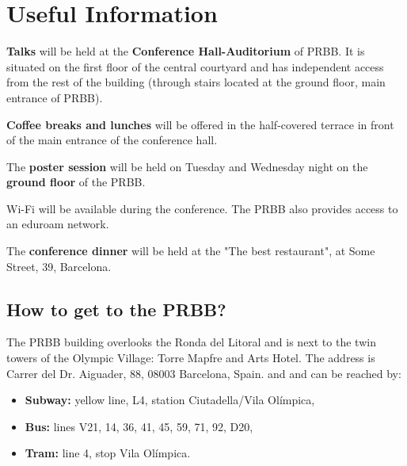 \documentclass[
	openany, %
	parskip=full, %
	12pt, %
	a4paper, %
]{conferencebooklet} %
\begin{document}

\chapter{Useful Information}

\textbf{Talks} will be held at the \textbf{Conference Hall-Auditorium} of PRBB. It is situated on the first floor of the central courtyard and
has independent access from the rest of the building (through stairs located at the ground floor, main entrance of PRBB). 

\textbf{Coffee breaks and lunches} will be offered in the half-covered terrace in front of the main entrance of the conference hall.

The \textbf{poster session} will be held on Tuesday and Wednesday night on the \textbf{ground floor} of the PRBB. 

Wi-Fi will be available during the conference. The PRBB also provides access to an eduroam network.

The \textbf{conference dinner} will be held at the "The best restaurant", at Some Street, 39, Barcelona.

\section{How to get to the PRBB?}

The PRBB building overlooks the Ronda del Litoral and is next to the twin towers of the Olympic Village: Torre Mapfre and Arts Hotel. The address is Carrer del Dr. Aiguader, 88, 08003 Barcelona, Spain. and and can be reached by:

\begin{itemize}
	\item \textbf{Subway:} yellow line, L4, station Ciutadella/Vila Ol\'{i}mpica,
	\item \textbf{Bus:} lines V21, 14, 36, 41, 45, 59, 71, 92, D20,
	\item \textbf{Tram:} line 4, stop Vila Ol\'{i}mpica.
\end{itemize}

\newpage
\end{document}
